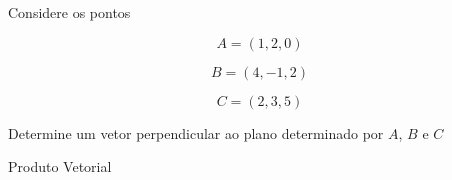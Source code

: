 \begin{question}
  Considere os pontos

  \[
  A=(1,2,0)
  \]

  \[
  B=(4,-1,2)
  \]

  \[
  C=(2,3,5)
  \]

  Determine um vetor perpendicular ao plano determinado por $A$, $B$ e $C$
\end{question}

\begin{resolution}{Produto Vetorial}

\end{resolution}

\endinput
